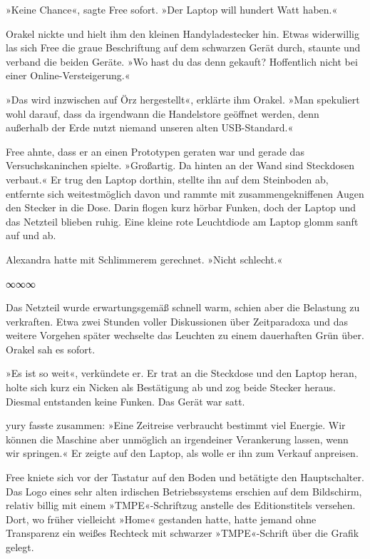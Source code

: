 »Keine Chance«, sagte Free sofort. »Der Laptop will hundert Watt haben.«

Orakel nickte und hielt ihm den kleinen Handyladestecker hin. Etwas widerwillig las sich Free die graue Beschriftung auf dem schwarzen Gerät durch, staunte und verband die beiden Geräte. »Wo hast du das denn gekauft? Hoffentlich nicht bei einer Online-Versteigerung.«

»Das wird inzwischen auf Örz hergestellt«, erklärte ihm Orakel. »Man spekuliert wohl darauf, dass da irgendwann die Handelstore geöffnet werden, denn außerhalb der Erde nutzt niemand unseren alten USB-Standard.«

Free ahnte, dass er an einen Prototypen geraten war und gerade das Versuchskaninchen spielte. »Großartig. Da hinten an der Wand sind Steckdosen verbaut.« Er trug den Laptop dorthin, stellte ihn auf dem Steinboden ab, entfernte sich weitestmöglich davon und rammte mit zusammengekniffenen Augen den Stecker in die Dose. Darin flogen kurz hörbar Funken, doch der Laptop und das Netzteil blieben ruhig. Eine kleine rote Leuchtdiode am Laptop glomm sanft auf und ab.

Alexandra hatte mit Schlimmerem gerechnet. »Nicht schlecht.«

\begin{center}
∞∞∞
\end{center}

Das Netzteil wurde erwartungsgemäß schnell warm, schien aber die Belastung zu verkraften. Etwa zwei Stunden voller Diskussionen über Zeitparadoxa und das weitere Vorgehen später wechselte das Leuchten zu einem dauerhaften Grün über. Orakel sah es sofort.

»Es ist so weit«, verkündete er. Er trat an die Steckdose und den Laptop heran, holte sich kurz ein Nicken als Bestätigung ab und zog beide Stecker heraus. Diesmal entstanden keine Funken. Das Gerät war satt.

yury fasste zusammen: »Eine Zeitreise verbraucht bestimmt viel Energie. Wir können die Maschine aber unmöglich an irgendeiner Verankerung lassen, wenn wir springen.« Er zeigte auf den Laptop, als wolle er ihn zum Verkauf anpreisen.

Free kniete sich vor der Tastatur auf den Boden und betätigte den Hauptschalter. Das Logo eines sehr alten irdischen Betriebssystems erschien auf dem Bildschirm, relativ billig mit einem »TMPE«-Schriftzug anstelle des Editionstitels versehen. Dort, wo früher vielleicht »Home« gestanden hatte, hatte jemand ohne Transparenz ein weißes Rechteck mit schwarzer »TMPE«-Schrift über die Grafik gelegt.

